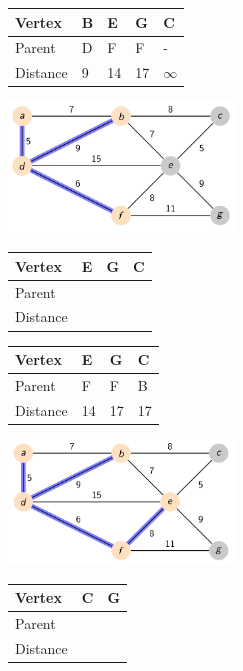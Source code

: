 \documentclass{beamer}
\begin{document}
\begin{frame}[fragile]
    \centering
    \begin{table}[]
        \begin{tabular}{|l|l|l|l|l|}
            \hline
            Vertex   & B & E  & G  & C  \\ \hline
            Parent   & D & F  & F  & -  \\ \hline
            Distance & 9 & 14 & 17 & $\infty$ \\ \hline
        \end{tabular}
    \end{table}
    \includegraphics[width=0.45\textwidth]{./imgs/dijkstra_walkthrough/dijkstra-4.png}
    \begin{table}[]
        \begin{tabular}{|l|l|l|l|}
            \hline
            Vertex   & E  & G  & C  \\ \hline
            Parent   &    &    &   \\ \hline
            Distance &    &    &  \\ \hline
        \end{tabular}
    \end{table}
\end{frame}

\begin{frame}[fragile]
    \centering
    \begin{table}[]
        \begin{tabular}{|l|l|l|l|}
            \hline
            Vertex   & E  & G  & C  \\ \hline
            Parent   & F  & F  & B  \\ \hline
            Distance & 14 & 17 & 17 \\ \hline
        \end{tabular}
    \end{table}
    \includegraphics[width=0.45\textwidth]{./imgs/dijkstra_walkthrough/dijkstra-5.png}
    \begin{table}[]
        \begin{tabular}{|l|l|l|}
            \hline
            Vertex   & C  & G  \\ \hline
            Parent   &   &   \\ \hline
            Distance &   &  \\ \hline
        \end{tabular}
    \end{table}
\end{frame}
\end{document}
